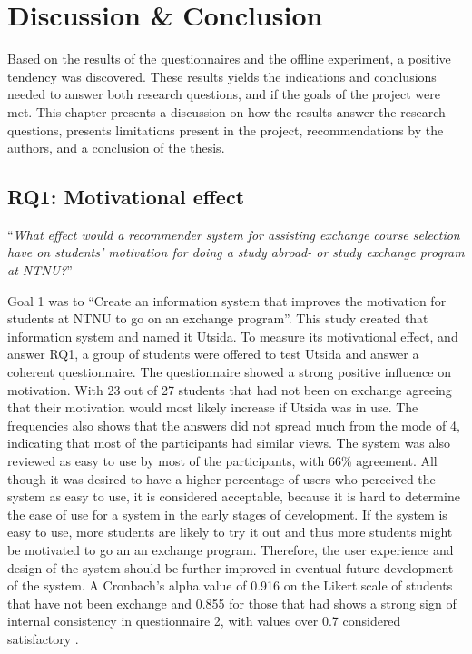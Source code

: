 \chapter{Discussion \& Conclusion}

Based on the results of the questionnaires and the offline experiment, a positive tendency was discovered. These results yields the indications and conclusions needed to answer both research questions, and if the goals of the project were met. This chapter presents a discussion on how the results answer the research questions, presents limitations present in the project, recommendations by the authors, and a conclusion of the thesis.

\section{RQ1: Motivational effect}

\enquote{\textit{What effect would a recommender system for assisting exchange course selection have on students' motivation for doing a study abroad- or study exchange program at NTNU?}}

Goal 1 was to \enquote{Create an information system that improves the motivation for students at NTNU to go on an exchange program}. This study created that information system and named it Utsida. To measure its motivational effect, and answer RQ1, a group of students were offered to test Utsida and answer a coherent questionnaire. The questionnaire showed a strong positive influence on motivation. With 23 out of 27 students that had not been on exchange agreeing that their motivation would most likely increase if Utsida was in use. The frequencies also shows that the answers did not spread much from the mode of 4, indicating that most of the participants had similar views. The system was also reviewed as easy to use by most of the participants, with 66\% agreement. All though it was desired to have a higher percentage of users who perceived the system as easy to use, it is considered acceptable, because it is hard to determine the ease of use for a system in the early stages of development. If the system is easy to use, more students are likely to try it out and thus more students might be motivated to go an an exchange program. Therefore, the user experience and design of the system should be further improved in eventual future development of the system. A Cronbach's alpha value of 0.916 on the Likert scale of students that have not been exchange and 0.855 for those that had shows a strong sign of internal consistency in questionnaire 2, with values over 0.7 considered satisfactory  \cite{bland1997statistics}.

